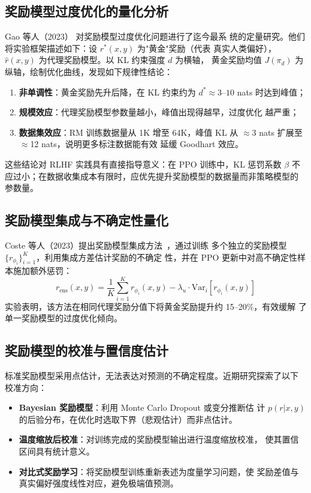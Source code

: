 \documentclass[12pt,a4paper,UTF8]{ctexart}
\begin{document}
\subsection{奖励模型过度优化的量化分析}

Gao 等人（2023）\cite{gao2023scaling} 对奖励模型过度优化问题进行了迄今最系
统的定量研究。他们将实验框架描述如下：设 $r^*(x,y)$ 为"黄金"奖励（代表
真实人类偏好），$\hat{r}(x,y)$ 为代理奖励模型。以 KL 约束强度 $d$ 为横轴，
黄金奖励均值 $J(\pi_d)$ 为纵轴，绘制优化曲线，发现如下规律性结论：

\begin{enumerate}[leftmargin=2em]
  \item \textbf{非单调性}：黄金奖励先升后降，在 KL 约束约为
    $d^* \approx 3\text{--}10$ nats 时达到峰值；
  \item \textbf{规模效应}：代理奖励模型参数量越小，峰值出现得越早，过度优化
    越严重；
  \item \textbf{数据集效应}：RM 训练数据量从 1K 增至 64K，峰值 KL 从
    $\approx$3 nats 扩展至 $\approx$12 nats，说明更多标注数据能有效
    延缓 Goodhart 效应。
\end{enumerate}

这些结论对 RLHF 实践具有直接指导意义：在 PPO 训练中，KL 惩罚系数 $\beta$
不应过小；在数据收集成本有限时，应优先提升奖励模型的数据量而非策略模型的
参数量。

\subsection{奖励模型集成与不确定性量化}

Coste 等人（2023）提出奖励模型集成方法~\cite{coste2023ensemble}，通过训练
多个独立的奖励模型 $\{r_{\phi_i}\}_{i=1}^K$，利用集成方差估计奖励的不确定
性，并在 PPO 更新中对高不确定性样本施加额外惩罚：
\begin{equation}
  r_{\mathrm{ens}}(x,y)
    = \frac{1}{K}\sum_{i=1}^K r_{\phi_i}(x,y)
      - \lambda_u \cdot \mathrm{Var}_i\!\left[r_{\phi_i}(x,y)\right]
\end{equation}
实验表明，该方法在相同代理奖励分值下将黄金奖励提升约 15--20\%，有效缓解
了单一奖励模型的过度优化倾向。

\subsection{奖励模型的校准与置信度估计}

标准奖励模型采用点估计，无法表达对预测的不确定程度。近期研究探索了以下
校准方向：
\begin{itemize}[leftmargin=2em]
  \item \textbf{Bayesian 奖励模型}：利用 Monte Carlo Dropout 或变分推断估
    计 $p(r|x,y)$ 的后验分布，在优化时选取下界（悲观估计）而非点估计。
  \item \textbf{温度缩放后校准}：对训练完成的奖励模型输出进行温度缩放校准，
    使其置信区间具有统计意义。
  \item \textbf{对比式奖励学习}：将奖励模型训练重新表述为度量学习问题，使
    奖励差值与真实偏好强度线性对应，避免极端值预测。
\end{itemize}
\end{document}
